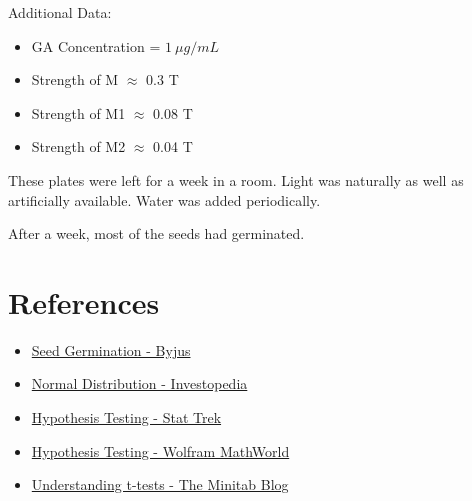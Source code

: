 \documentclass[twocolumn]{article}
\begin{document}
Additional Data:
\begin{itemize}
    \item GA Concentration = $1\ \mu g / mL$
    \item Strength of M $\approx$ 0.3 T
    \item Strength of M1 $\approx$ 0.08 T
    \item Strength of M2 $\approx$ 0.04 T
\end{itemize}

These plates were left for a week in a room. Light was naturally as well as artificially available. Water was added periodically. 

After a week, most of the seeds had germinated. 

\section{References}
\begin{itemize}
    \item \href{https://byjus.com/biology/seed-germination/}{Seed Germination - Byjus}
    \item \href{https://www.investopedia.com/terms/n/normaldistribution.asp}{Normal Distribution - Investopedia}
    \item \href{https://stattrek.com/hypothesis-test/hypothesis-testing.aspx}{Hypothesis Testing - Stat Trek}
    \item \href{http://mathworld.wolfram.com/HypothesisTesting.html}{Hypothesis Testing - Wolfram MathWorld}
    \item \href{https://blog.minitab.com/blog/adventures-in-statistics-2/understanding-t-tests-1-sample-2-sample-and-paired-t-tests}{Understanding t-tests - The Minitab Blog}
\end{itemize}
\end{document}
